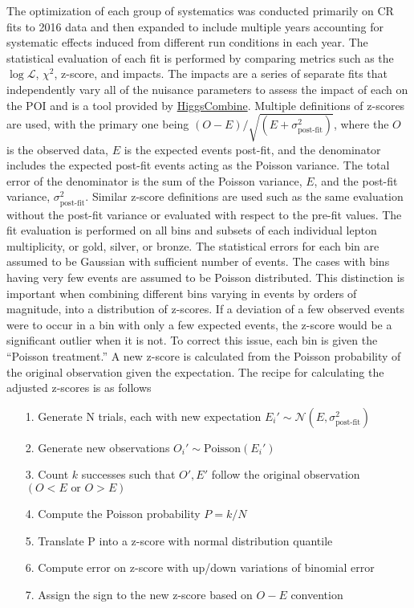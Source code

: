 The optimization of each group of systematics was conducted primarily on CR fits to 2016 data and then expanded to include multiple years accounting for systematic effects induced from different run conditions in each year. The statistical evaluation of each fit is performed by comparing metrics such as the $\log\mathcal{L}$, $\chi^2$, z-score, and impacts. The impacts are a series of separate fits that independently vary all of the nuisance parameters to assess the impact of each on the POI and is a tool provided by \url{HiggsCombine}. Multiple definitions of z-scores are used, with the primary one being $ (O-E)/\sqrt{(E+\sigma_{\text{post-fit}}^2)}$, where the $O$ is the observed data, $E$ is the expected events post-fit, and the denominator includes the expected post-fit events acting as the Poisson variance. The total error of the denominator is the sum of the Poisson variance, $E$, and the post-fit variance, $\sigma_{\text{post-fit}}^2$. Similar z-score definitions are used such as the same evaluation without the post-fit variance or evaluated with respect to the pre-fit values. The fit evaluation is performed on all bins and subsets of each individual lepton multiplicity, or gold, silver, or bronze. The statistical errors for each bin are assumed to be Gaussian with sufficient number of events. The cases with bins having very few events are assumed to be Poisson distributed. This distinction is important when combining different bins varying in events by orders of magnitude, into a distribution of z-scores. If a deviation of a few observed events were to occur in a bin with only a few expected events, the z-score would be a significant outlier when it is not. To correct this issue, each bin is given the ``Poisson treatment.'' A new z-score is calculated from the Poisson probability of the original observation given the expectation. The recipe for calculating the adjusted z-scores is as follows
\begin{itemize}
\item[1.] Generate N trials, each with new expectation $E_i' \sim \mathcal{N}(E,\sigma_{\text{post-fit}}^2)$
\item[2.] Generate new observations $O_i'\sim \text{Poisson}(E_i')$
\item[3.] Count $k$ successes such that $O',E'$ follow the original observation $(O<E \,\, \text{or} \, \, O>E)$
\item[4.] Compute the Poisson probability $P=k/N$ 
\item[5.] Translate P into a z-score with normal distribution quantile
\item[6.] Compute error on z-score with up/down variations of binomial error
\item[7.] Assign the sign to the new z-score based on $O-E$ convention
\end{itemize} 

